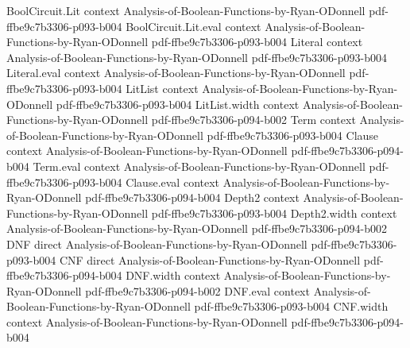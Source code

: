 \begin{theorem}
\leanok
{}
\proofstep
  {BoolCircuit.Lit}
  {context}
  {Analysis-of-Boolean-Functions-by-Ryan-ODonnell}
  {pdf-ffbe9c7b3306-p093-b004}
\proofstep
  {BoolCircuit.Lit.eval}
  {context}
  {Analysis-of-Boolean-Functions-by-Ryan-ODonnell}
  {pdf-ffbe9c7b3306-p093-b004}
\proofstep
  {Literal}
  {context}
  {Analysis-of-Boolean-Functions-by-Ryan-ODonnell}
  {pdf-ffbe9c7b3306-p093-b004}
\proofstep
  {Literal.eval}
  {context}
  {Analysis-of-Boolean-Functions-by-Ryan-ODonnell}
  {pdf-ffbe9c7b3306-p093-b004}
\proofstep
  {LitList}
  {context}
  {Analysis-of-Boolean-Functions-by-Ryan-ODonnell}
  {pdf-ffbe9c7b3306-p093-b004}
\proofstep
  {LitList.width}
  {context}
  {Analysis-of-Boolean-Functions-by-Ryan-ODonnell}
  {pdf-ffbe9c7b3306-p094-b002}
\proofstep
  {Term}
  {context}
  {Analysis-of-Boolean-Functions-by-Ryan-ODonnell}
  {pdf-ffbe9c7b3306-p093-b004}
\proofstep
  {Clause}
  {context}
  {Analysis-of-Boolean-Functions-by-Ryan-ODonnell}
  {pdf-ffbe9c7b3306-p094-b004}
\proofstep
  {Term.eval}
  {context}
  {Analysis-of-Boolean-Functions-by-Ryan-ODonnell}
  {pdf-ffbe9c7b3306-p093-b004}
\proofstep
  {Clause.eval}
  {context}
  {Analysis-of-Boolean-Functions-by-Ryan-ODonnell}
  {pdf-ffbe9c7b3306-p094-b004}
\proofstep
  {Depth2}
  {context}
  {Analysis-of-Boolean-Functions-by-Ryan-ODonnell}
  {pdf-ffbe9c7b3306-p093-b004}
\proofstep
  {Depth2.width}
  {context}
  {Analysis-of-Boolean-Functions-by-Ryan-ODonnell}
  {pdf-ffbe9c7b3306-p094-b002}
\proofstep
  {DNF}
  {direct}
  {Analysis-of-Boolean-Functions-by-Ryan-ODonnell}
  {pdf-ffbe9c7b3306-p093-b004}
\proofstep
  {CNF}
  {direct}
  {Analysis-of-Boolean-Functions-by-Ryan-ODonnell}
  {pdf-ffbe9c7b3306-p094-b004}
\proofstep
  {DNF.width}
  {context}
  {Analysis-of-Boolean-Functions-by-Ryan-ODonnell}
  {pdf-ffbe9c7b3306-p094-b002}
\proofstep
  {DNF.eval}
  {context}
  {Analysis-of-Boolean-Functions-by-Ryan-ODonnell}
  {pdf-ffbe9c7b3306-p093-b004}
\proofstep
  {CNF.width}
  {context}
  {Analysis-of-Boolean-Functions-by-Ryan-ODonnell}
  {pdf-ffbe9c7b3306-p094-b004}

\end{theorem}
